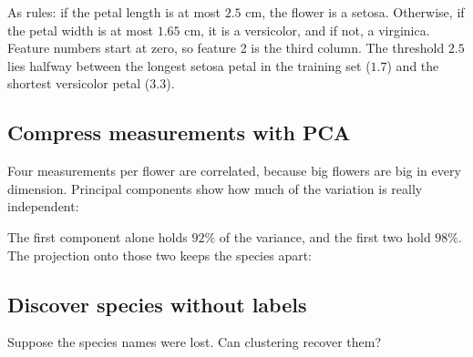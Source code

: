 \begin{codepairs}
\end{codepairs}

As rules: if the petal length is at most \(2.5\) cm, the flower is a setosa.
Otherwise, if the petal width is at most \(1.65\) cm, it is a versicolor, and if
not, a virginica. Feature numbers start at zero, so feature 2 is the third column.
The threshold \(2.5\) lies halfway between the longest setosa petal in the
training set (\(1.7\)) and the shortest versicolor petal (\(3.3\)).

\subsection*{Compress measurements with PCA}

Four measurements per flower are correlated, because big flowers are big in every
dimension. Principal components show how much of the variation is really
independent:

\begin{codepairs}
\end{codepairs}

The first component alone holds \(92\%\) of the variance, and the first two hold
\(98\%\). The projection onto those two keeps the species apart:


\subsection*{Discover species without labels}

Suppose the species names were lost. Can clustering recover them?

\begin{codepairs}
\end{codepairs}

